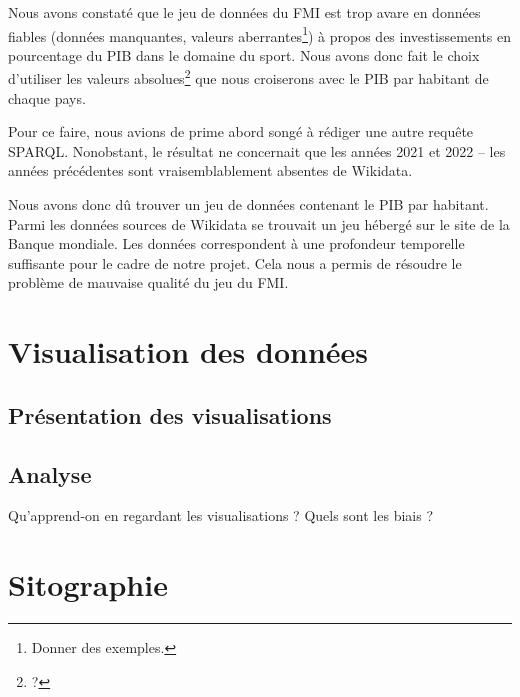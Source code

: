 \documentclass[hidelinks, 12pt]{article}
\begin{document}
Nous avons constaté que le jeu de données du FMI est trop avare en données fiables (données manquantes, valeurs aberrantes\footnote{Donner des exemples.}) à propos des investissements en pourcentage du PIB dans le domaine du sport. Nous avons donc fait le choix d'utiliser les valeurs absolues\footnote{?} que nous croiserons avec le PIB par habitant de chaque pays.
		
Pour ce faire, nous avions de prime abord songé à rédiger une autre requête SPARQL. Nonobstant, le résultat ne concernait que les années 2021 et 2022 -- les années précédentes sont vraisemblablement absentes de Wikidata.
		
\label{banquemondiale}Nous avons donc dû trouver un jeu de données contenant le PIB par habitant. Parmi les données sources de Wikidata se trouvait un jeu hébergé sur le site de la Banque mondiale. Les données correspondent à une profondeur temporelle suffisante pour le cadre de notre projet. Cela nous a permis de résoudre le problème de mauvaise qualité du jeu du FMI.


\section{Visualisation des données}

\subsection{Présentation des visualisations}

\subsection{Analyse}

Qu'apprend-on en regardant les visualisations ? Quels sont les biais ?
\newpage


\section{Sitographie}
\printbibliography[heading=none]
\newpage

\tableofcontents
\end{document}
